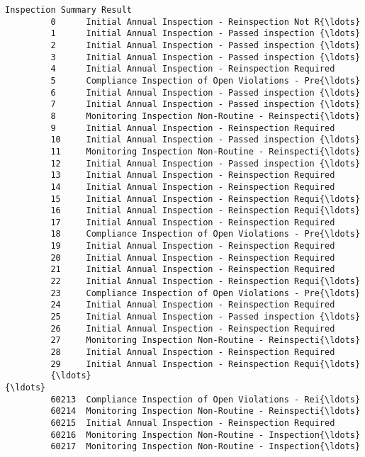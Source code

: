 \documentclass[11pt]{article}
\begin{document}
\begin{Verbatim}[commandchars=\\\{\}]
                                        Inspection Summary Result  
         0      Initial Annual Inspection - Reinspection Not R{\ldots}  
         1      Initial Annual Inspection - Passed inspection {\ldots}  
         2      Initial Annual Inspection - Passed inspection {\ldots}  
         3      Initial Annual Inspection - Passed inspection {\ldots}  
         4      Initial Annual Inspection - Reinspection Required  
         5      Compliance Inspection of Open Violations - Pre{\ldots}  
         6      Initial Annual Inspection - Passed inspection {\ldots}  
         7      Initial Annual Inspection - Passed inspection {\ldots}  
         8      Monitoring Inspection Non-Routine - Reinspecti{\ldots}  
         9      Initial Annual Inspection - Reinspection Required  
         10     Initial Annual Inspection - Passed inspection {\ldots}  
         11     Monitoring Inspection Non-Routine - Reinspecti{\ldots}  
         12     Initial Annual Inspection - Passed inspection {\ldots}  
         13     Initial Annual Inspection - Reinspection Required  
         14     Initial Annual Inspection - Reinspection Required  
         15     Initial Annual Inspection - Reinspection Requi{\ldots}  
         16     Initial Annual Inspection - Reinspection Requi{\ldots}  
         17     Initial Annual Inspection - Reinspection Required  
         18     Compliance Inspection of Open Violations - Pre{\ldots}  
         19     Initial Annual Inspection - Reinspection Required  
         20     Initial Annual Inspection - Reinspection Required  
         21     Initial Annual Inspection - Reinspection Required  
         22     Initial Annual Inspection - Reinspection Requi{\ldots}  
         23     Compliance Inspection of Open Violations - Pre{\ldots}  
         24     Initial Annual Inspection - Reinspection Required  
         25     Initial Annual Inspection - Passed inspection {\ldots}  
         26     Initial Annual Inspection - Reinspection Required  
         27     Monitoring Inspection Non-Routine - Reinspecti{\ldots}  
         28     Initial Annual Inspection - Reinspection Required  
         29     Initial Annual Inspection - Reinspection Requi{\ldots}  
         {\ldots}                                                  {\ldots}  
         60213  Compliance Inspection of Open Violations - Rei{\ldots}  
         60214  Monitoring Inspection Non-Routine - Reinspecti{\ldots}  
         60215  Initial Annual Inspection - Reinspection Required  
         60216  Monitoring Inspection Non-Routine - Inspection{\ldots}  
         60217  Monitoring Inspection Non-Routine - Inspection{\ldots}  

\end{Verbatim}
\end{document}
